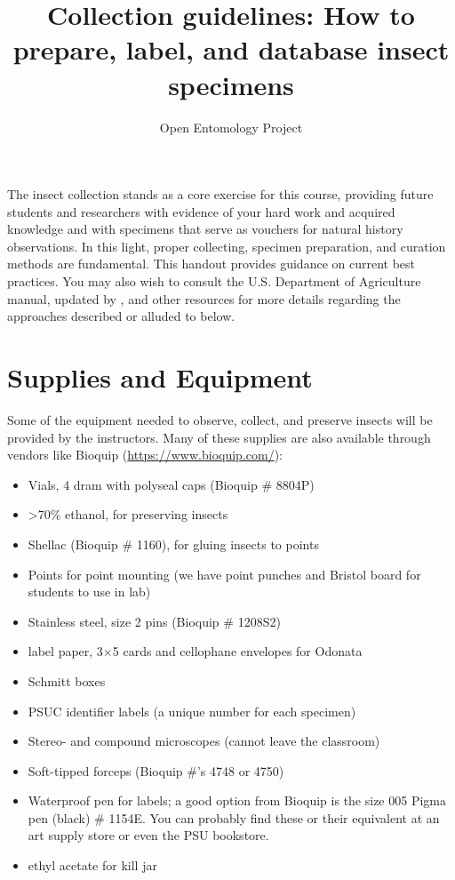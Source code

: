 \documentclass[letterpaper, 11pt]{article}
\title{Collection guidelines: How to prepare, label, and database insect specimens}
\author{Open Entomology Project}
\begin{document}
\cleanlookdateon %
\maketitle
\thispagestyle{fancy}

The insect collection stands as a core exercise for this course, providing future students and researchers with evidence of your hard work and acquired knowledge and with specimens that serve as vouchers for natural history observations. In this light, proper collecting, specimen preparation, and curation methods are fundamental. This handout provides guidance on current best practices. You may also wish to consult the U.S. Department of Agriculture manual, updated by \cite{USDAmanual}, and other resources for more details regarding the approaches described or alluded to below. 

\section*{Supplies and Equipment}
Some of the equipment needed to observe, collect, and preserve insects will be provided by the instructors. Many of these supplies are also available through vendors like Bioquip (\url{https://www.bioquip.com/}):

\begin{itemize}
\item Vials, 4 dram with polyseal caps (Bioquip \# 8804P)
\item \textgreater70\% ethanol, for preserving insects
\item Shellac (Bioquip \# 1160), for gluing insects to points
\item Points for point mounting (we have point punches and Bristol board for students to use in lab)
\item Stainless steel, size 2 pins (Bioquip \# 1208S2)
\item label paper, 3$\times$5 cards and cellophane envelopes for Odonata
\item Schmitt boxes
\item PSUC identifier labels (a unique number for each specimen)
\item Stereo- and compound microscopes (cannot leave the classroom)
\item Soft-tipped forceps (Bioquip \#'s 4748 or 4750)
\item Waterproof pen for labels; a good option from Bioquip is the size 005 Pigma pen (black) \# 1154E. You can probably find these or their equivalent at an art supply store or even the PSU bookstore.
\item ethyl acetate for kill jar
\end{itemize}
\end{document}
